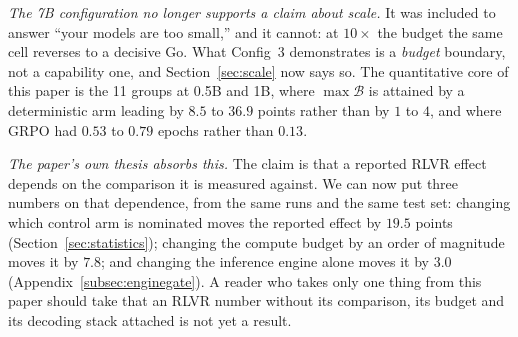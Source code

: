 \emph{The 7B configuration no longer supports a claim about scale.} It was
included to answer ``your models are too small,'' and it cannot: at $10\times$
the budget the same cell reverses to a decisive Go. What Config~3 demonstrates
is a \emph{budget} boundary, not a capability one, and
Section~\ref{sec:scale} now says so. The quantitative core of this paper is the
11 groups at 0.5B and 1B, where $\max\mathcal{B}$ is attained by a deterministic
arm leading by $8.5$ to $36.9$ points rather than by $1$ to $4$, and where GRPO
had $0.53$ to $0.79$ epochs rather than $0.13$.

\emph{The paper's own thesis absorbs this.} The claim is that a reported RLVR
effect depends on the comparison it is measured against. We can now put three
numbers on that dependence, from the same runs and the same test set: changing
which control arm is nominated moves the reported effect by $19.5$ points
(Section~\ref{sec:statistics}); changing the compute budget by an order of
magnitude moves it by $7.8$; and changing the inference engine alone moves it by
$3.0$ (Appendix~\ref{subsec:enginegate}). A reader who takes only one thing from
this paper should take that an RLVR number without its comparison, its budget
and its decoding stack attached is not yet a result.
